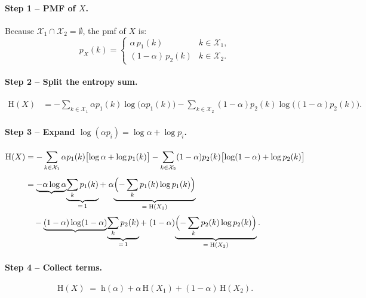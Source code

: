\documentclass[12pt,a4paper]{article}
\theoremstyle{plain}
\theoremstyle{definition}
\theoremstyle{remark}
\newcommand{\HH}{\mathrm{H}}
\newcommand{\hb}{\mathrm{h}}          %
\begin{document}
\paragraph{Step 1 – PMF of $X$.}

Because $\mathcal{X}_1\cap\mathcal{X}_2=\emptyset$, the pmf of $X$ is:
\[
  p_X(k) = \begin{cases}
    \alpha\, p_1(k)       & k \in \mathcal{X}_1,\\
    (1-\alpha)\,p_2(k)   & k \in \mathcal{X}_2.
  \end{cases}
\]

\paragraph{Step 2 – Split the entropy sum.}

\begin{align*}
  \HH(X)
    &= -\sum_{k\in\mathcal{X}_1}\!\alpha p_1(k)\log\!\bigl(\alpha p_1(k)\bigr)
       -\sum_{k\in\mathcal{X}_2}\!(1-\alpha)p_2(k)\log\!\bigl((1-\alpha)p_2(k)\bigr).
\end{align*}

\paragraph{Step 3 – Expand $\log(\alpha p_i) = \log\alpha + \log p_i$.}

\begin{align*}
  \HH(X)
    &= -\sum_{k\in\mathcal{X}_1}\alpha p_1(k)\bigl[\log\alpha + \log p_1(k)\bigr]
       -\sum_{k\in\mathcal{X}_2}(1-\alpha)p_2(k)\bigl[\log(1-\alpha)+\log p_2(k)\bigr]\\[4pt]
    &= \underbrace{-\alpha\log\alpha}_{}\!\underbrace{\sum_{k}p_1(k)}_{=\,1}
       +\;\alpha\!\underbrace{\Bigl(-\sum_{k}p_1(k)\log p_1(k)\Bigr)}_{=\;\HH(X_1)}\\[2pt]
    &\quad -\underbrace{(1-\alpha)\log(1-\alpha)}_{}\!\underbrace{\sum_{k}p_2(k)}_{=\,1}
       +\;(1-\alpha)\!\underbrace{\Bigl(-\sum_{k}p_2(k)\log p_2(k)\Bigr)}_{=\;\HH(X_2)}.
\end{align*}

\paragraph{Step 4 – Collect terms.}

\begin{resultbox}
\[
  \boxed{\HH(X) \;=\; \hb(\alpha) + \alpha\,\HH(X_1) + (1-\alpha)\,\HH(X_2).}
\]
\end{resultbox}
\end{document}
